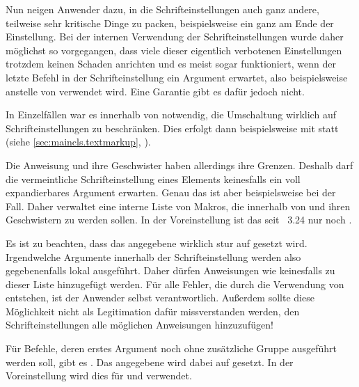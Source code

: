 Nun neigen Anwender dazu, in die Schrifteinstellungen auch ganz andere,
teilweise sehr kritische Dinge zu packen, beispielsweise ein
 ganz am Ende der Einstellung. Bei der internen
Verwendung der Schrifteinstellungen wurde daher möglichst so vorgegangen, dass
viele dieser eigentlich verbotenen Einstellungen trotzdem keinen Schaden
anrichten und es meist sogar funktioniert, wenn der letzte Befehl in der
Schrifteinstellung ein Argument erwartet, also beispielsweise 
anstelle von  verwendet wird. Eine Garantie gibt es dafür
jedoch nicht.

In Einzelfällen war es innerhalb von \KOMAScript{} notwendig, die Umschaltung
wirklich auf Schrifteinstellungen zu beschränken. Dies erfolgt dann
beispielsweise mit
%
%
%
 statt  (siehe
\autoref{sec:maincls.textmarkup},
).

Die Anweisung  und ihre Geschwister
haben allerdings ihre Grenzen. Deshalb darf die vermeintliche Schrifteinstellung
eines Elements keinesfalls ein voll expandierbares Argument erwarten. Genau
das ist aber beispielsweise bei  der
Fall. Daher verwaltet \KOMAScript{} eine interne Liste von Makros, die
innerhalb von  und ihren Geschwistern
zu  werden sollen. In der Voreinstellung ist das seit
\KOMAScript~3.24 nur noch .

Es ist zu beachten, dass das angegebene  wirklich stur auf
 gesetzt wird. Irgendwelche Argumente innerhalb der
Schrifteinstellung werden also gegebenenfalls lokal ausgeführt. Daher dürfen
Anweisungen wie  keinesfalls zu dieser Liste hinzugefügt
werden. Für alle Fehler, die durch die Verwendung von
 entstehen, ist der Anwender selbst
verantwortlich. Außerdem sollte diese Möglichkeit nicht als Legitimation dafür
missverstanden werden, den Schrifteinstellungen alle möglichen Anweisungen
hinzuzufügen!

Für Befehle, deren erstes Argument noch ohne zusätzliche
Gruppe ausgeführt werden soll, gibt es
. Das angegebene  wird dabei auf
 gesetzt. In der Voreinstellung wird dies für
 und  verwendet.

